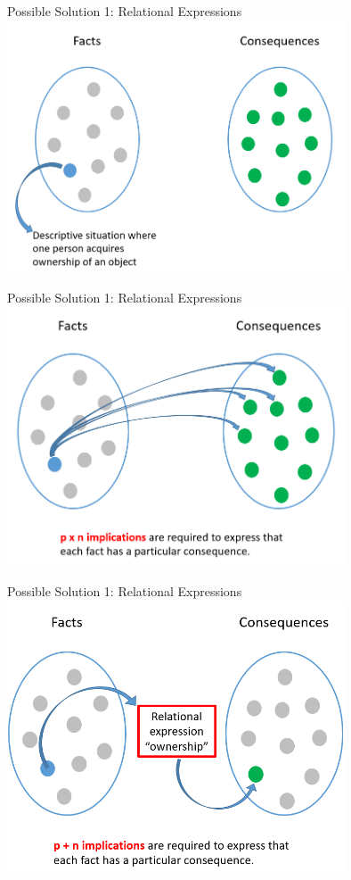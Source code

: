 \documentclass[]{beamer}
\begin{document}
\begin{frame}{Possible Solution 1: Relational Expressions}      
    \includegraphics[width=10cm]{images/Sem_Pres_11_1.png}
\end{frame}

\begin{frame}{Possible Solution 1: Relational Expressions}      
    \includegraphics[width=10cm]{images/Sem_Pres_11_2.png}
\end{frame}

\begin{frame}{Possible Solution 1: Relational Expressions}      
    \includegraphics[width=10cm]{images/Sem_Pres_11_3.png}
\end{frame}
\end{document}
